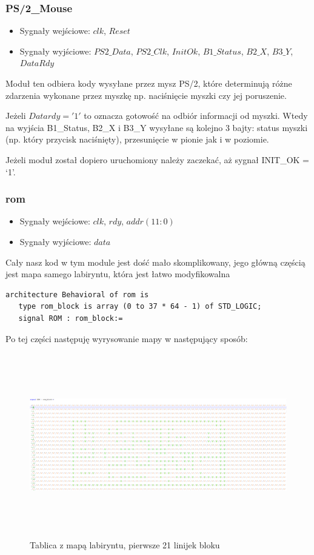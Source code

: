 \documentclass[a4paper]{article}
\begin{document}
\subsubsection{PS/2\_Mouse}
\begin{itemize}
\item Sygnały wejściowe: $clk$, $Reset$
\item Sygnały wyjściowe: $PS2\_Data$, $PS2\_Clk$, $InitOk$, $B1\_Status$, $B2\_X$, $B3\_Y$, $DataRdy$
\end{itemize}

Moduł ten odbiera kody wysyłane przez mysz PS/2, które determinują różne zdarzenia wykonane przez myszkę np. naciśnięcie myszki czy jej poruszenie.

Jeżeli $Datardy = '1'$ to oznacza gotowość na odbiór informacji od myszki. Wtedy na wyjścia B1\_Status, B2\_X i B3\_Y wysyłane są kolejno 3 bajty: status myszki (np. który przycisk naciśnięty), przesunięcie w pionie jak i w poziomie.

Jeżeli moduł został dopiero uruchomiony należy zaczekać, aż sygnał INIT\_OK = ‘1’.

\subsubsection{rom}
\begin{itemize}
\item Sygnały wejściowe: $clk$, $rdy$, $addr(11:0)$
\item Sygnały wyjściowe: $data$
\end{itemize}

Cały nasz kod w tym module jest dość mało skomplikowany, jego główną częścią jest mapa samego labiryntu, która jest łatwo modyfikowalna

\begin{verbatim}
architecture Behavioral of rom is
   type rom_block is array (0 to 37 * 64 - 1) of STD_LOGIC;
   signal ROM : rom_block:= 
\end{verbatim}
Po tej części następuję wyrysowanie mapy w następujący sposób:

\begin{figure}[H]
  \caption{Tablica z mapą labiryntu, pierwsze 21 linijek bloku}
  \includegraphics[width=15cm, height=8cm]{mapa}
  \centering
\end{figure}
\end{document}
